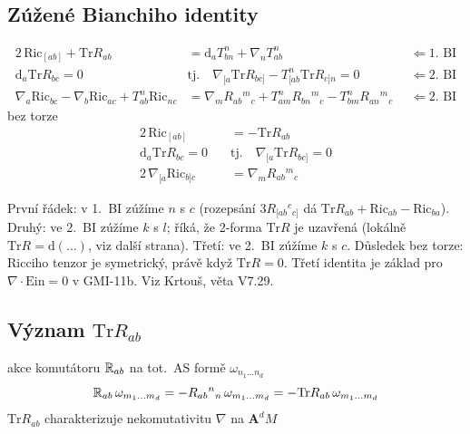 \subsection*{Zúžené Bianchiho identity}
\begin{align*}
  2\,\mathrm{Ric}_{[ab]} + \mathrm{Tr}R_{ab} &= \mathrm{d}_a T^{n}_{bn} + \nabla_n T^{n}_{ab} && \Leftarrow\ \text{1.\ BI} \\
  \mathrm{d}_a\mathrm{Tr}R_{bc} = 0 \quad &\text{tj.}\quad \nabla_{[a}\mathrm{Tr}R_{bc]} - T^{n}_{[ab}\mathrm{Tr}R_{c]n} = 0 && \Leftarrow\ \text{2.\ BI} \\
  \nabla_a\mathrm{Ric}_{bc} - \nabla_b\mathrm{Ric}_{ac} + T^{n}_{ab}\mathrm{Ric}_{nc}
  &= \nabla_m R_{ab}{}^{m}{}_{c} + T^{n}_{am}R_{bn}{}^{m}{}_{c} - T^{n}_{bm}R_{an}{}^{m}{}_{c} && \Leftarrow\ \text{2.\ BI}
\end{align*}
bez torze
\begin{align*}
  2\,\mathrm{Ric}_{[ab]} &= -\mathrm{Tr}R_{ab} \\
  \mathrm{d}_a\mathrm{Tr}R_{bc} = 0 \quad &\text{tj.}\quad \nabla_{[a}\mathrm{Tr}R_{bc]} = 0 \\
  2\,\nabla_{[a}\mathrm{Ric}_{b]c} &= \nabla_m R_{ab}{}^{m}{}_{c}
\end{align*}

\begin{vysvetleni}
První řádek: v 1.\ BI zúžíme $n$ s $c$ (rozepsání $3R_{[ab}{}^{c}{}_{c]}$ dá $\mathrm{Tr}R_{ab}+\mathrm{Ric}_{ab}-\mathrm{Ric}_{ba}$). Druhý: ve 2.\ BI zúžíme $k$ s $l$; říká, že 2-forma $\mathrm{Tr}R$ je uzavřená (lokálně $\mathrm{Tr}R=\mathrm{d}(\dots)$, viz další strana). Třetí: ve 2.\ BI zúžíme $k$ s $c$.
Důsledek bez torze: Ricciho tenzor je symetrický, právě když $\mathrm{Tr}R=0$. Třetí identita je základ pro $\nabla\cdot\mathrm{Ein}=0$ v GMI-11b. Viz Krtouš, věta V7.29.
\end{vysvetleni}

\subsection*{Význam $\mathrm{Tr}R_{ab}$}
akce komutátoru $\mathbb{R}_{ab}$ na tot.\ AS formě $\omega_{n_1\dots n_d}$
\[
  \mathbb{R}_{ab}\,\omega_{m_1\dots m_d} = -R_{ab}{}^{n}{}_{n}\,\omega_{m_1\dots m_d} = -\mathrm{Tr}R_{ab}\,\omega_{m_1\dots m_d}
\]
$\mathrm{Tr}R_{ab}$ charakterizuje nekomutativitu $\nabla$ na $\mathbf{A}^d M$

